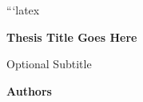 ```latex

\begin{titlepage}

\thispagestyle{empty}



\begin{minipage}[t]{0.45\textwidth}
    \raggedright
\end{minipage}
\hfill
\begin{minipage}[t]{0.45\textwidth}
    \raggedleft
\end{minipage}



\vspace*{45mm}



\begin{center}

    {\Huge\bfseries
        Thesis Title Goes Here
        \par
    }

    \vspace{6mm}

    {\Large
        Optional Subtitle
        \par
    }

\end{center}



\vspace{15mm}

\begin{center}

    {\large
        \textbf{Authors}
        \par
    }


\end{center}
\end{titlepage}
